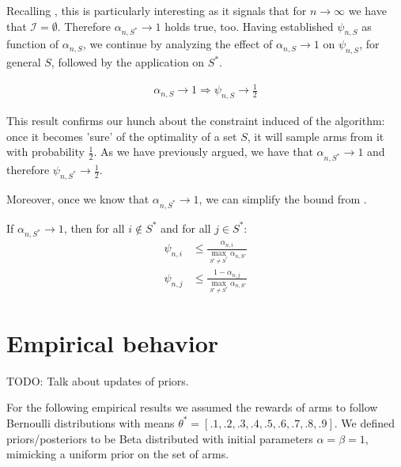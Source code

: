 Recalling , this is particularly interesting as it signals that for $n \rightarrow \infty$ we have that $\mathcal{I} = \emptyset$. Therefore $\alpha_{n, S^*} \rightarrow 1$ holds true, too.
Having established $\psi_{n, S}$ as function of $\alpha_{n, S}$, we continue by analyzing the effect of $\alpha_{n, S} \rightarrow 1$ on $\psi_{n, S}$, for general $S$, followed by the application on $S^*$.
\begin{lemma}\label{lemma:psi_convergence}
  \begin{align}
    \alpha_{n, S} \rightarrow 1 \Rightarrow \psi_{n, S} \rightarrow \frac{1}{2}
  \end{align}
\end{lemma}
This result confirms our hunch about the constraint induced of the algorithm: once it becomes 'sure' of the optimality of a set $S$, it will sample arms from it with probability $\frac{1}{2}$. As we have previously argued, we have that $\alpha_{n, S^*} \rightarrow 1$ and therefore $\psi_{n, S^*} \rightarrow \frac{1}{2}$.

Moreover, once we know that $\alpha_{n, S^*} \rightarrow 1$, we can simplify the bound from .
\begin{lemma}\label{lemma:measurement_plan_bound_max}
  If $\alpha_{n, S^*} \rightarrow 1$, then for all $i \notin S^*$ and for all $j \in S^*$:
  \begin{align}
    \psi_{n, i} &\leq \frac{\alpha_{n, i}}{\max_{S' \neq S^*} \alpha_{n, S'}} \\
    \psi_{n, j} &\leq \frac{1 - \alpha_{n, j}}{\max_{S' \neq S^*} \alpha_{n, S'}}
  \end{align}
\end{lemma}

\section{Empirical behavior}\label{section:empirical_behavior}

TODO: Talk about updates of priors.

For the following empirical results we assumed the rewards of arms to follow Bernoulli distributions with means $\theta^* = [.1, .2, .3, .4, .5, .6, .7, .8, .9]$. We defined priors/posteriors to be Beta distributed with initial parameters $\alpha = \beta = 1$, mimicking a uniform prior on the set of arms.

